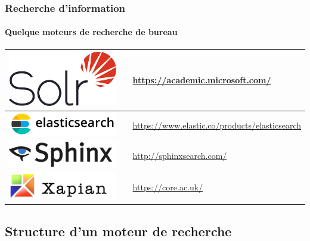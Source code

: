 \documentclass{beamer}
\begin{document}
\begin{frame}
\frametitle{Recherche d'information}
\framesubtitle{Quelque moteurs de recherche de bureau}

\begin{tabular}{p{}cp{}}
	
	\hline
	
	\includegraphics[height=.8cm]{..//img/Bweb02-ri-gmail/solr-logo.png} &
	& 
	\url{https://academic.microsoft.com/}  \\
	
	\hline
	
	\includegraphics[height=.8cm]{..//img/Bweb02-ri-gmail/elastic-logo.png} &
	& 
	\url{https://www.elastic.co/products/elasticsearch} \\
	
	\hline
	
	\includegraphics[height=.8cm]{..//img/Bweb02-ri-gmail/sphinx-logo.png} & 
	& 
	\url{http://sphinxsearch.com/} \\
	
	\hline
	
	\includegraphics[height=.8cm]{..//img/Bweb02-ri-gmail/xapian-logo.png} & 
	& 
	\url{https://core.ac.uk/} \\
	
	\hline
	
\end{tabular}


\end{frame}

\subsection{Structure d'un moteur de recherche}
\end{document}
